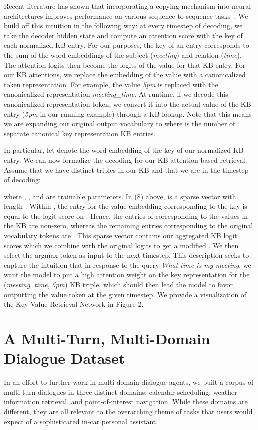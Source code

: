 \documentclass[11pt,a4paper]{article}
\begin{document}
  Recent literature has shown that incorporating a copying mechanism into neural architectures improves performance on various sequence-to-sequence tasks~\cite{jia-liang:2016:P16-1,gu-EtAl:2016:P16-1,ling-EtAl:2016:P16-1,gulcehre-EtAl:2016:P16-1,E17-2075}. We build off this intuition in the following way: at every timestep of decoding, we take the decoder hidden state and compute an attention score with the key of each normalized KB entry. For our purposes, the key of an entry corresponds to the sum of the word embeddings of the subject (\emph{meeting}) and relation (\emph{time}). The attention logits then become the logits of the value for that KB entry. For our KB attentions, we replace the embedding of the value with a canonicalized token representation. For example, the value \emph{5pm} is replaced with the canonicalized representation \emph{meeting\_time}. At runtime, if we decode this canonicalized representation token, we convert it into the actual value of the KB entry (\emph{5pm} in our running example) through a KB lookup. Note that this means we are expanding our original output vocabulary to  where  is the number of separate canonical key representation KB entries. 

  In particular, let  denote the word embedding of the key of our  normalized KB entry. We can now formalize the decoding for our KB attention-based retrieval. Assume that we have  distinct triples in our KB and that we are in the  timestep of decoding: 
    

    \noindent where , , and  are trainable parameters. In (8) above,  is a sparse vector with length . Within , the entry for the value embedding  corresponding to the key  is equal to the logit score  on . Hence, the  entries of  corresponding to the values in the KB are non-zero, whereas the remaining entries corresponding to the original vocabulary tokens are . This sparse vector contains our aggregated KB logit scores which we combine with the original logits to get a modified . We then select the argmax token as input to the next timestep. This description seeks to capture the intuition that in response to the query \emph{What time is my meeting}, we want the model to put a high attention weight on the key representation for the (\emph{meeting}, \emph{time}, \emph{5pm}) KB triple, which should then lead the model to favor outputting the value token at the given timestep. We provide a visualization of the Key-Value Retrieval Network in Figure 2. 



\section{A Multi-Turn, Multi-Domain Dialogue Dataset}
    In an effort to further work in multi-domain dialogue agents, we built a corpus of multi-turn dialogues in three distinct domains: calendar scheduling, weather information retrieval, and point-of-interest navigation. While these domains are different, they are all relevant to the overarching theme of tasks that users would expect of a sophisticated in-car personal assistant.\\
\end{document}
